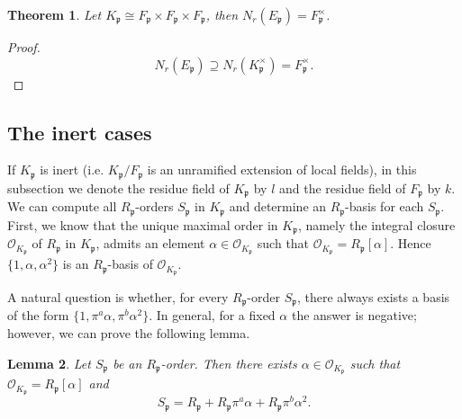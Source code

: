 \documentclass[12pt]{article}
\theoremstyle{plain}
\newtheorem{theorem}{Theorem}[section]
\newtheorem{lemma}[theorem]{Lemma}
\theoremstyle{definition}
\theoremstyle{remark}
\begin{document}
\begin{theorem}\label{msplit}
Let $K_\mathfrak{p}\cong F_\mathfrak{p}\times F_\mathfrak{p}\times F_\mathfrak{p}$, then $N_r(E_\mathfrak{p})=F_\mathfrak{p}^\times$.
\end{theorem}

\begin{proof}
$$N_r(E_\mathfrak{p})\supseteq N_r(K_\mathfrak{p}^\times)=F_\mathfrak{p}^\times.$$
\end{proof}



\subsection{The inert cases}
If $K_\mathfrak{p}$ is inert (i.e. $K_\mathfrak{p}/F_\mathfrak{p}$ is an unramified extension of local fields), in this subsection we denote the residue field of $K_\mathfrak{p}$ by $l$ and the residue field of $F_\mathfrak{p}$ by $k$. We can compute all $R_\mathfrak{p}$-orders $S_\mathfrak{p}$ in $K_\mathfrak{p}$ and determine an $R_\mathfrak{p}$-basis for each $S_\mathfrak{p}$. First, we know that the unique maximal order in $K_\mathfrak{p}$, namely the integral closure $\mathcal{O}_{K_\mathfrak{p}}$ of $R_\mathfrak{p}$ in $K_\mathfrak{p}$, admits an element $\alpha\in \mathcal{O}_{K_\mathfrak{p}}$ such that $\mathcal{O}_{K_\mathfrak{p}}=R_\mathfrak{p}[\alpha]$. Hence $\{1,\alpha,\alpha^2\}$ is an $R_\mathfrak{p}$-basis of $\mathcal{O}_{K_\mathfrak{p}}$.

A natural question is whether, for every $R_\mathfrak{p}$-order $S_\mathfrak{p}$, there always exists a basis of the form $\{1,\pi^a\alpha,\pi^b\alpha^2\}$. In general, for a fixed $\alpha$ the answer is negative; however, we can prove the following lemma.

\begin{lemma}
Let $S_\mathfrak{p}$ be an $R_\mathfrak{p}$-order. Then there exists $\alpha\in \mathcal{O}_{K_\mathfrak{p}}$ such that $\mathcal{O}_{K_\mathfrak{p}}=R_\mathfrak{p}[\alpha]$ and
$$
S_\mathfrak{p}=R_\mathfrak{p}+R_\mathfrak{p}\pi^a\alpha+R_\mathfrak{p}\pi^b\alpha^2.
$$
\end{lemma}
\end{document}
